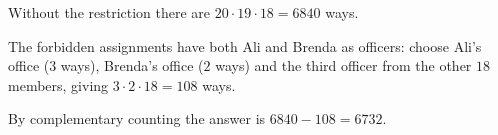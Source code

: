 Without the restriction there are $20\cdot19\cdot18=6840$ ways.

The forbidden assignments have both Ali and Brenda as officers: choose Ali's office ($3$ ways), Brenda's office ($2$ ways) and the third officer from the other $18$ members, giving $3\cdot2\cdot18=108$ ways.

By complementary counting the answer is $6840-108=\boxed{6732}$.
